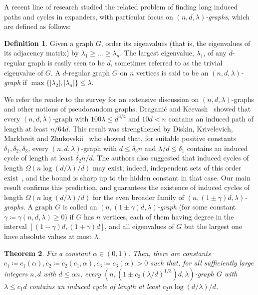 \documentclass[reqno,a4paper]{amsart}
\newtheorem{theorem}{Theorem}[section]
\theoremstyle{definition}
\newtheorem{definition}[theorem]{Definition}
\begin{document}
A recent line of research studied the related problem of finding long induced paths and cycles in expanders, with particular focus on \emph{$(n,d,\lambda)$-graphs}, which are defined as follows: 
\begin{definition}
    Given a graph $G$, order its eigenvalues (that is, the eigenvalues of its adjacency matrix) by $\lambda_1 \geq \ldots \geq \lambda_n$. 
    The largest eigenvalue, $\lambda_1$, of any $d$-regular graph is easily seen to be $d$, sometimes referred to as the trivial eigenvalue of $G$. 
    A $d$-regular graph $G$ on $n$ vertices is said to be an \emph{$(n, d, \lambda)$-graph} if $\max\{|\lambda_2|,|\lambda_n|\}\le \lambda$.
\end{definition}
We refer the reader to the survey \cite{KS06} for an extensive discussion on $(n,d,\lambda)$-graphs and other notions of pseudorandom graphs.
Dragani\'c and Keevash~\cite{DK25} showed that every $(n,d,\lambda)$-graph with $100\lambda\le d^{3/4}$ and $10d<n$ contains an induced path of length at least $n/64d$.
This result was strengthened by Diskin, Krivelevich, Markbreit and Zhukovskii~\cite{DKMZ25} who showed that, for suitable positive constants $\delta_1,\delta_2,\delta_3$, every $(n,d,\lambda)$-graph with $d\le\delta_3 n$ and $\lambda/d\le\delta_1$ contains an induced cycle of length at least $\delta_2 n/d$.
The authors also suggested that induced cycles of length $\Omega(n\log(d/\lambda)/d)$ may exist; indeed, independent sets of this order exist~\cite{AKS99,KS06}, and the bound is sharp up to the hidden constant in that case.
Our main result confirms this prediction, and guarantees the existence of induced cycles of length $\Omega(n\log(d/\lambda)/d)$ for the even broader family of \emph{$(n, (1\pm\gamma)d, \lambda)$-graphs}. A graph $G$ is called an \emph{$(n, (1\pm\gamma)d, \lambda)$-graph} (for some constant $\gamma\coloneq \gamma(n,d,\lambda)\ge 0$) if $G$ has $n$ vertices, each of them having degree in the interval $[(1-\gamma)d, (1+\gamma)d]$, and all eigenvalues of $G$ but the largest one have absolute values at most $\lambda$.

\begin{theorem}\label{th: main}
Fix a constant $\alpha\in (0,1)$. 
Then, there are constants $c_1\coloneqq c_1(\alpha),c_2\coloneqq c_2(c_1,\alpha),c_3\coloneq c_3(\alpha)>0$ such that, for all sufficiently large integers $n,d$ with $d\le \alpha n$, every $\left(n,\left(1\pm c_3(\lambda/d)^{1/3}\right)d,\lambda\right)$-graph $G$ with $\lambda\le c_1 d$ contains an induced cycle of length at least $c_2 n\log(d/\lambda)/d$.
\end{theorem}
\end{document}
